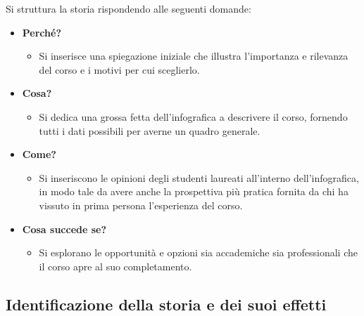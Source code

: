 \bigskip
\noindent Si struttura la storia rispondendo alle seguenti domande:
\begin{itemize}
    \item \textbf{Perché?}
    \begin{itemize}
        \item Si inserisce una spiegazione iniziale che illustra l'importanza e rilevanza del corso e i motivi per cui sceglierlo.
    \end{itemize}
    \item \textbf{Cosa?}
    \begin{itemize}
        \item Si dedica una grossa fetta dell'infografica a descrivere il corso, fornendo tutti i dati possibili per averne un quadro generale.
    \end{itemize}
    \item \textbf{Come?}
    \begin{itemize}
        \item Si inseriscono le opinioni degli studenti laureati all'interno dell'infografica, in modo tale da avere anche la prospettiva più pratica fornita
        da chi ha vissuto in prima persona l'esperienza del corso.
    \end{itemize}
    \item \textbf{Cosa succede se?}
    \begin{itemize}
        \item Si esplorano le opportunità e opzioni sia accademiche sia professionali che il corso apre al suo completamento.
    \end{itemize}
\end{itemize}


\subsection{Identificazione della storia e dei suoi effetti}
